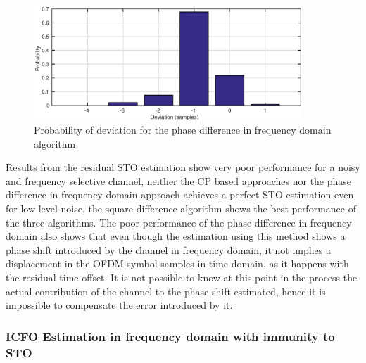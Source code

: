\begin{figure}[hbt]
  \centering
    \includegraphics[width=0.9\textwidth]
      {./figures/prob_deviation_ph_freq}
  \caption{Probability of deviation for the phase difference in frequency domain algorithm}
  \label{fig:sto_esti_dev_ph_diff_chn}
\end{figure}


Results from the residual STO estimation show very poor performance for a noisy and frequency selective channel, neither the CP based approaches nor the phase difference in frequency domain approach achieves a perfect STO estimation even for low level noise, the square difference  algorithm shows the best performance of the three algorithms. The poor performance of the phase difference in frequency domain also shows that even though the estimation using this method shows a phase shift introduced by the channel in frequency domain, it not implies a displacement in the OFDM symbol samples in time domain, as it happens with the residual time offset. It is not possible to know at this point in the process the actual contribution of the channel to the phase shift estimated, hence it is impossible to compensate the error introduced by it.  


\subsubsection{ICFO Estimation in frequency domain with immunity to STO}

